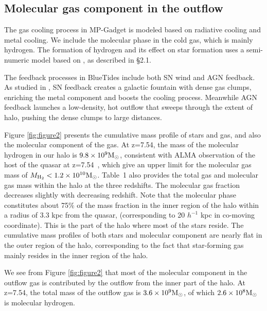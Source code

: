 \documentclass[a4paper,usenatbib]{mnras}
\begin{document}
\subsection{Molecular gas component in the outflow}

The gas cooling process in MP-Gadget is modeled based on radiative cooling and metal cooling. We include the molecular phase in the cold gas,  which is mainly hydrogen. The formation of hydrogen and its effect on star formation uses a semi-numeric model based on \cite{Krumholtz}, as described in \S 2.1.

The feedback processes in BlueTides include both SN wind and AGN feedback. As studied in \cite{Biernacki}, SN feedback creates a galactic fountain with dense gas clumps, enriching the metal component and boosts the cooling process. Meanwhile AGN feedback launches a low-density, hot outflow that sweeps through the extent of halo, pushing the dense clumps to large distances. 

Figure \ref{fig:figure2} presents the cumulative mass profile of stars and gas, and also the molecular component of the gas. At z=7.54, the mass of the molecular hydrogen in our halo is $9.8\times 10^9 \rm{M}_{\odot}$, consistent with ALMA observation of the host of the quasar at z=7.54~\citep{Venemans2017}, which give an upper limit for the molecular gas mass of $M_{\rm {H}_{2}} < 1.2\times 10^{10} \rm {M}_{\odot}$. 
Table~1 also provides the total gas and molecular gas mass within the halo at the three redshifts. The molecular gas fraction decreases slightly with decreasing redshift. 
Note that the molecular phase constitutes about 75\% of the mass fraction in the inner region of the halo within a radius of 3.3 kpc from the quasar, (corresponding to 20 $h^{-1}$ kpc in co-moving coordinate).
This is the part of the halo where most of the stars reside. The cumulative mass profiles of both stars and molecular component are nearly flat in the outer region of the halo, corresponding to the fact that star-forming gas mainly resides in the inner region of the halo.

We see from Figure \ref{fig:figure2} that most of the molecular component in the outflow gas is contributed by the outflow from the inner part of the halo. At z=7.54, the total mass of the outflow gas is $3.6\times 10^9 \rm{M}_{\odot}$, of which $2.6\times 10^8 \rm{M}_{\odot}$ is molecular hydrogen.
\end{document}
